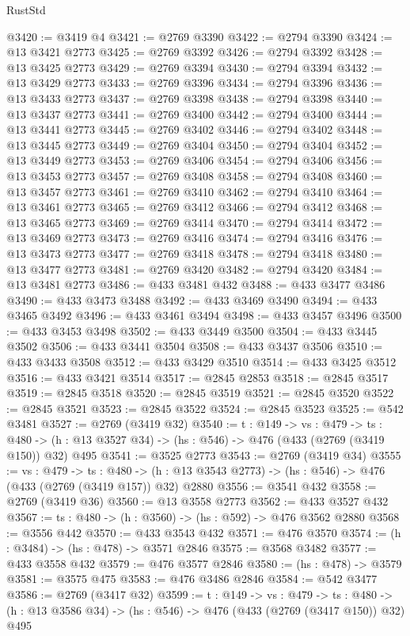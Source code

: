 \begin{lexlean}{RustStd}
\begin{coremodule}
@3420 := @3419 @4
@3421 := @2769 @3390
@3422 := @2794 @3390
@3424 := @13 @3421 @2773
@3425 := @2769 @3392
@3426 := @2794 @3392
@3428 := @13 @3425 @2773
@3429 := @2769 @3394
@3430 := @2794 @3394
@3432 := @13 @3429 @2773
@3433 := @2769 @3396
@3434 := @2794 @3396
@3436 := @13 @3433 @2773
@3437 := @2769 @3398
@3438 := @2794 @3398
@3440 := @13 @3437 @2773
@3441 := @2769 @3400
@3442 := @2794 @3400
@3444 := @13 @3441 @2773
@3445 := @2769 @3402
@3446 := @2794 @3402
@3448 := @13 @3445 @2773
@3449 := @2769 @3404
@3450 := @2794 @3404
@3452 := @13 @3449 @2773
@3453 := @2769 @3406
@3454 := @2794 @3406
@3456 := @13 @3453 @2773
@3457 := @2769 @3408
@3458 := @2794 @3408
@3460 := @13 @3457 @2773
@3461 := @2769 @3410
@3462 := @2794 @3410
@3464 := @13 @3461 @2773
@3465 := @2769 @3412
@3466 := @2794 @3412
@3468 := @13 @3465 @2773
@3469 := @2769 @3414
@3470 := @2794 @3414
@3472 := @13 @3469 @2773
@3473 := @2769 @3416
@3474 := @2794 @3416
@3476 := @13 @3473 @2773
@3477 := @2769 @3418
@3478 := @2794 @3418
@3480 := @13 @3477 @2773
@3481 := @2769 @3420
@3482 := @2794 @3420
@3484 := @13 @3481 @2773
@3486 := @433 @3481 @432
@3488 := @433 @3477 @3486
@3490 := @433 @3473 @3488
@3492 := @433 @3469 @3490
@3494 := @433 @3465 @3492
@3496 := @433 @3461 @3494
@3498 := @433 @3457 @3496
@3500 := @433 @3453 @3498
@3502 := @433 @3449 @3500
@3504 := @433 @3445 @3502
@3506 := @433 @3441 @3504
@3508 := @433 @3437 @3506
@3510 := @433 @3433 @3508
@3512 := @433 @3429 @3510
@3514 := @433 @3425 @3512
@3516 := @433 @3421 @3514
@3517 := @2845 @2853
@3518 := @2845 @3517
@3519 := @2845 @3518
@3520 := @2845 @3519
@3521 := @2845 @3520
@3522 := @2845 @3521
@3523 := @2845 @3522
@3524 := @2845 @3523
@3525 := @542 @3481
@3527 := @2769 (@3419 @32)
@3540 := {t : @149} ->
  {vs : @479} ->
  {ts : @480} -> (h : @13 @3527 @34) -> (hs : @546) -> @476 (@433 (@2769 (@3419 @150)) @32) @495
@3541 := @3525 @2773
@3543 := @2769 (@3419 @34)
@3555 := {vs : @479} ->
  {ts : @480} -> (h : @13 @3543 @2773) -> (hs : @546) -> @476 (@433 (@2769 (@3419 @157)) @32) @2880
@3556 := @3541 @432
@3558 := @2769 (@3419 @36)
@3560 := @13 @3558 @2773
@3562 := @433 @3527 @432
@3567 := {ts : @480} -> (h : @3560) -> (hs : @592) -> @476 @3562 @2880
@3568 := @3556 @442
@3570 := @433 @3543 @432
@3571 := @476 @3570
@3574 := (h : @3484) -> (hs : @478) -> @3571 @2846
@3575 := @3568 @3482
@3577 := @433 @3558 @432
@3579 := @476 @3577 @2846
@3580 := (hs : @478) -> @3579
@3581 := @3575 @475
@3583 := @476 @3486 @2846
@3584 := @542 @3477
@3586 := @2769 (@3417 @32)
@3599 := {t : @149} ->
  {vs : @479} ->
  {ts : @480} -> (h : @13 @3586 @34) -> (hs : @546) -> @476 (@433 (@2769 (@3417 @150)) @32) @495

\end{coremodule}
\end{lexlean}
